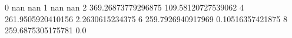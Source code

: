 0 nan nan
1 nan nan
2 369.26873779296875 109.58120727539062
4 261.9505920410156 2.2630615234375
6 259.7926940917969 0.10516357421875
8 259.6875305175781 0.0
